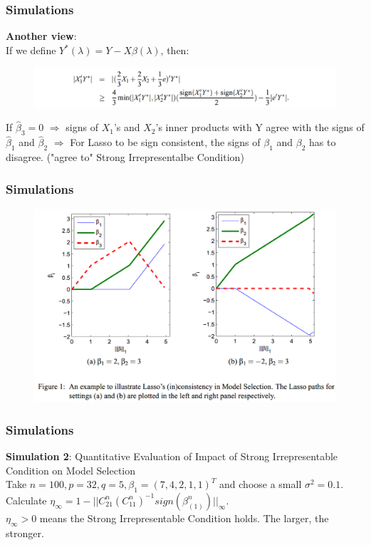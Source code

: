\documentclass{beamer}
\begin{document}
	\begin{frame}
		\frametitle{Simulations}
		\textbf{Another view}:\\
		If we define $Y^*(\lambda) = Y - X\hat{\beta}(\lambda)$, then:
		\begin{figure}
			\includegraphics[width=1.1\linewidth]{image015.png}
		\end{figure}
		If $\hat{\beta}_3 = 0$ $\Rightarrow$ signs of $X_1$'s and $X_2$'s inner products with Y agree with the signs of $\hat{\beta}_1$ and $\hat{\beta}_2$ $\Rightarrow$ For Lasso to be sign consistent, the signs of $\beta_1$ and $\beta_2$ has to disagree. ("agree to" Strong Irrepresentalbe Condition)
	\end{frame}
	
	\begin{frame}
		\frametitle{Simulations}
		\begin{figure}
			\includegraphics[width=1\linewidth]{image016.png}
		\end{figure}
	\end{frame}
	
	\begin{frame}
		\frametitle{Simulations}
		\textbf{Simulation 2}: Quantitative Evaluation of Impact of Strong Irrepresentable Condition on Model Selection\\
		Take $n=100, p = 32, q = 5, \beta_1 = (7,4,2,1,1)^T$ and choose a small $\sigma^2 = 0.1$. Calculate $\eta_{\infty} = 1 - ||C_{21}^n(C_{11}^n)^{-1}sign(\beta_{(1)}^n)||_{\infty}$.\\
		\vspace{\baselineskip}
		$\eta_{\infty} > 0$ means the Strong Irrepresentable Condition holds. The larger, the stronger.
	\end{frame}
	
\end{document}
